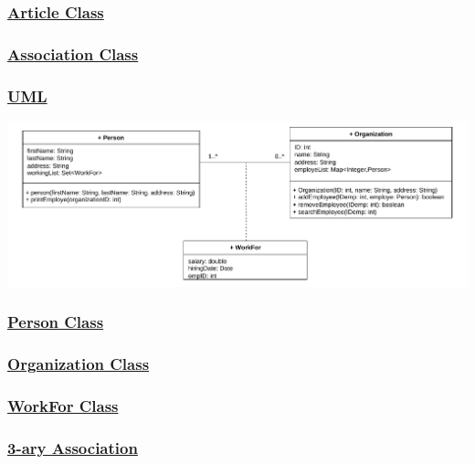 \vspace{-0.2cm}


\subsubsection*{\underline{Article Class}}




\subsubsection*{\underline{Association Class}}
\subsubsection*{\underline{UML}}


\includegraphics[width=\textwidth]{Chapters/Diagram/OOP/EX2/ex2.d.drawio.pdf}

\subsubsection*{\underline{Person Class}}



\subsubsection*{\underline{Organization Class}}


\newpage
\subsubsection*{\underline{WorkFor Class}}



\subsubsection*{\underline{3-ary Association}}

